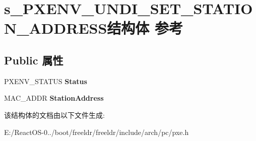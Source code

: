 \hypertarget{structs___p_x_e_n_v___u_n_d_i___s_e_t___s_t_a_t_i_o_n___a_d_d_r_e_s_s}{}\section{s\+\_\+\+P\+X\+E\+N\+V\+\_\+\+U\+N\+D\+I\+\_\+\+S\+E\+T\+\_\+\+S\+T\+A\+T\+I\+O\+N\+\_\+\+A\+D\+D\+R\+E\+S\+S结构体 参考}
\label{structs___p_x_e_n_v___u_n_d_i___s_e_t___s_t_a_t_i_o_n___a_d_d_r_e_s_s}
\subsection*{Public 属性}
\begin{DoxyCompactItemize}
\item 
\mbox{\label{structs___p_x_e_n_v___u_n_d_i___s_e_t___s_t_a_t_i_o_n___a_d_d_r_e_s_s_adb53a50cb5757a70f791b6d57a11017a}} 
P\+X\+E\+N\+V\+\_\+\+S\+T\+A\+T\+US {\bfseries Status}
\item 
\mbox{\label{structs___p_x_e_n_v___u_n_d_i___s_e_t___s_t_a_t_i_o_n___a_d_d_r_e_s_s_a04ed96fb6ee5b32957a68d0d5210a72d}} 
M\+A\+C\+\_\+\+A\+D\+DR {\bfseries Station\+Address}
\end{DoxyCompactItemize}


该结构体的文档由以下文件生成\+:\begin{DoxyCompactItemize}
\item 
E\+:/\+React\+O\+S-\/0../boot/freeldr/freeldr/include/arch/pc/pxe.\+h\end{DoxyCompactItemize}
